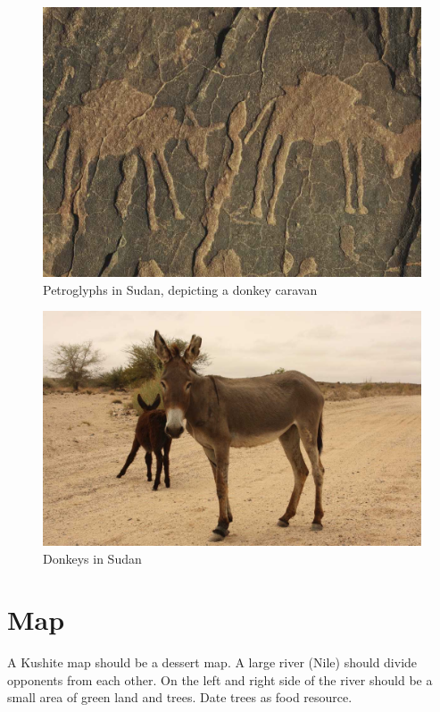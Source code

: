 \documentclass[a4paper,12pt]{scrreprt}
\begin{document}
\begin{figure}[H]
	\centering
	\includegraphics[width=\textwidth]{img/trader_land/petroglyphs_donkey_caravan}
	\caption{Petroglyphs in Sudan, depicting a donkey caravan}
\end{figure}

\begin{figure}[H]
	\centering
	\includegraphics[width=\textwidth]{img/trader_land/donkey_sudan}
	\caption{Donkeys in Sudan}
\end{figure}

\section{Map}

A Kushite map should be a dessert map. A large river (Nile)  should divide opponents from each other. On the left and right side of the river should be a small area of green land and trees. Date trees as food resource.
\end{document}
